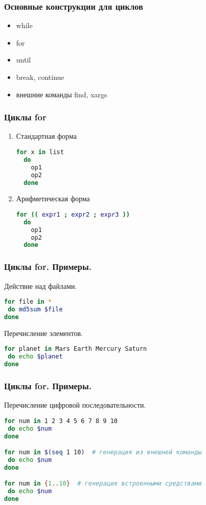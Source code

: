 \begin{frame}
\frametitle{Основные конструкции для циклов}
  \begin{itemize}
   \item while
   \item for
   \item until
   \item break, continue 
   \item внешние команды find, xargs 
  \end{itemize}
\end{frame}

\begin{frame}[fragile]
  \frametitle{Циклы for}
  \begin{enumerate}
    \item Стандартная форма
\begin{lstlisting}[language=sh,frame=single]
  for x in list 
  do
    op1
    op2
  done
\end{lstlisting}
    \item Арифметическая форма
\begin{lstlisting}[language=sh,frame=single]
  for (( expr1 ; expr2 ; expr3 )) 
  do 
    op1
    op2
  done
\end{lstlisting}
  \end{enumerate}
\end{frame}

\begin{frame}[fragile]
\frametitle{ Циклы for. Примеры.}
  \begin{block}{Действие над файлами.}
\begin{lstlisting}[language=sh,frame=single]
for file in *
 do md5sum $file
done
\end{lstlisting}
  \end{block}

\begin{block}{Перечисление элементов.}
\begin{lstlisting}[language=sh,frame=single]
for planet in Mars Earth Mercury Saturn
 do echo $planet 
done
\end{lstlisting}
  \end{block}
\end{frame}

\begin{frame}[fragile]
\frametitle{ Циклы for. Примеры.}
  \begin{block}{Перечисление цифровой последовательности.}
\begin{lstlisting}[language=sh,frame=single]
for num in 1 2 3 4 5 6 7 8 9 10
 do echo $num
done

for num in $(seq 1 10)  # генерация из внешней команды
 do echo $num
done

for num in {1..10}  # генерация встроенными средствами
 do echo $num
done

\end{lstlisting}
  \end{block}
\end{frame}

